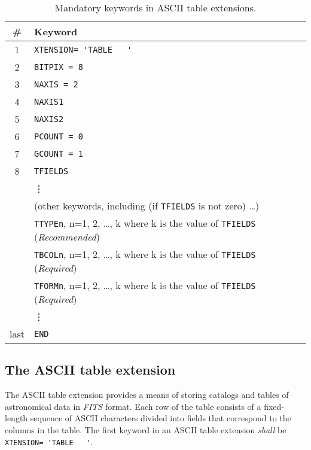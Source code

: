\documentclass[onecolumn]{aa}
\begin{document}
\begin{table*}
\centering
\caption{Mandatory keywords in ASCII table extensions.}
\label{t:hdr3}
\begin{tabular}{cl} 
\hline \hline
\# & Keyword  \\
\hline
       1 & {\verb*+XTENSION= 'TABLE   '+} \\
       2 & {\tt BITPIX = 8} \\
       3 & {\tt NAXIS = 2} \\
       4 & {\tt NAXIS1} \\
       5 & {\tt NAXIS2} \\
       6 & {\tt PCOUNT = 0} \\
       7 & {\tt GCOUNT = 1} \\
       8 & {\tt TFIELDS} \\
         & \vdots \\
         & (other keywords, including (if {\tt TFIELDS} is not zero) \ldots ) \\
         & {\tt TTYPEn}, n=1, 2, \ldots, k where k is the value of
           {\tt TFIELDS} ({\em Recommended})\\
         & {\tt TBCOLn}, n=1, 2, \ldots, k where k is the value of 
           {\tt TFIELDS} ({\em Required}) \\
         & {\tt TFORMn}, n=1, 2, \ldots, k where k is the value of 
           {\tt TFIELDS} ({\em Required}) \\
         & \vdots \\
    last  & {\tt END} \\
\hline
\end{tabular}
\end{table*}


  \subsection{The ASCII table extension}
     \label{s:ATabl}

The ASCII table extension  provides a means of storing 
catalogs and tables
of astronomical data in {\em FITS\/} format.  Each row of the table consists 
of a fixed-length sequence of ASCII characters divided into fields that 
correspond to the columns in the table.
The first keyword in an ASCII table extension {\em shall}
be {\verb*+XTENSION= 'TABLE   '+}.  
   
\end{document}
